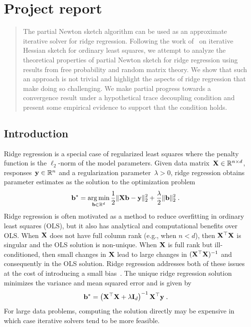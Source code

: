 

\section{Project report}


\begin{abstract}
The partial Newton sketch algorithm can be used as an approximate iterative solver for ridge regression. Following the work of~\citet{Lacotte:2020} on iterative Hessian sketch for ordinary least squares, we attempt to analyze the theoretical properties of partial Newton sketch for ridge regression using results from free probability and random matrix theory. We show that such an approach is not trivial and highlight the aspects of ridge regression that make doing so challenging. We make partial progress towards a convergence result under a hypothetical trace decoupling condition and present some empirical evidence to support that the condition holds.
\end{abstract}


\subsection{Introduction}

Ridge regression is a special case of regularized least squares where the penalty function is the $\ell_2$-norm of the model parameters. Given data matrix~$\mathbf{X}\in\mathbb{R}^{n\times d}$, responses~$\mathbf{y}\in\mathbb{R}^n$ and a regularization parameter~$\lambda>0$, ridge regression obtains parameter estimates as the solution to the optimization problem
\[
\mathbf{b}^* = \operatorname*{arg\,min}_{\mathbf{b}\in\mathbb{R}^d} \frac{1}{2}\|\mathbf{X}\mathbf{b}-\mathbf{y}\|_2^2 + \frac{\lambda}{2}\|\mathbf{b}\|_2^2 \;.
\]
Ridge regression is often motivated as a method to reduce overfitting in ordinary least squares (OLS), but it also has analytical and computational benefits over OLS. When $\mathbf{X}$ does not have full column rank (e.g., when $n< d$), then $\mathbf{X}^\top\mathbf{X}$ is singular and the OLS solution is non-unique. When $\mathbf{X}$ is full rank but ill-conditioned, then small changes in $\mathbf{X}$ lead to large changes in $(\mathbf{X}^\top\mathbf{X})^{-1}$ and consequently in the OLS solution. Ridge regression addresses both of these issues at the cost of introducing a small bias~\citep{Chowdhury:2018}. The unique ridge regression solution minimizes the variance and mean squared error and is given by
\[
\mathbf{b}^* = \left(\mathbf{X}^\top\mathbf{X} + \lambda\mathbf{I}_d\right)^{-1}\mathbf{X}^\top\mathbf{y} \;.
\]
For large data problems, computing the solution directly may be expensive in which case iterative solvers tend to be more feasible.
\\

